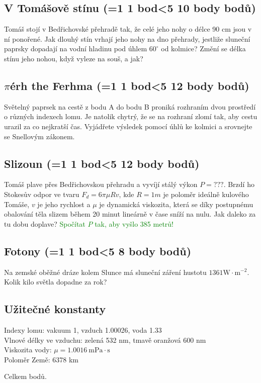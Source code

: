 \documentclass[11pt,a4paper,landscape,twocolumn]{article}
\newcounter{bodycounter}
\newcommand{\bodystring}[1]{\ifnum #1=1 1 bod\else\ifnum #1<5 #1 body\else #1 bodů\fi\fi}
\newcommand{\uloha}[3]{
\subsection{#1 (\bodystring{#2})}
#3\addtocounter{bodycounter}{#2}}
\begin{document}
\uloha{V Tomášově stínu}{10}{
Tomáš stojí v Bedřichovské přehradě tak, že celé jeho nohy o délce 90 cm jsou v ní ponořené. Jak dlouhý stín vrhají jeho nohy na dno přehrady, jestliže sluneční paprsky dopadají na vodní hladinu pod úhlem $60^\circ$ od kolmice? Změní se délka stínu jeho nohou, když vyleze na souš, a jak?
}

\uloha{$\pi$érh the Ferhma}{12}{
Světelný paprsek na cestě z bodu A do bodu B proniká rozhraním dvou prostředí o různých indexech lomu. Je natolik chytrý, že se na rozhraní zlomí tak, aby cestu urazil za co nejkratší čas. Vyjádřete výsledek pomocí úhlů ke kolmici a srovnejte se Snellovým zákonem.
}

\uloha{Slizoun}{12}{
Tomáš plave přes Bedřichovskou přehradu a vyvíjí stálý výkon $P = ???$. Brzdí ho Stokesův odpor ve tvaru $F_d = 6\pi \mu Rv$, kde $R = 1 m$ je poloměr ideálně kulového Tomáše, $v$ je jeho rychlost a $\mu$ je dynamická viskozita, která se díky postupnému obalování těla slizem během 20 minut lineárně v čase sníží na nulu. Jak daleko za tu dobu doplave? \textcolor{green}{Spočítat $P$ tak, aby vyšlo 385 metrů!}
}

\uloha{Fotony}{8}{
Na zemské oběžné dráze kolem Slunce má sluneční záření hustotu $1361 \mathrm{W\cdot m^{-2}}$. Kolik kilo světla dopadne za rok?
}

\subsection*{Užitečné konstanty}
Indexy lomu: vakuum 1, vzduch 1.00026, voda 1.33 \\
Vlnové délky ve vzduchu: zelená 532 nm, tmavě oranžová 600 nm\\
Viskozita vody: $\mu = 1.0016~\mathrm{mPa\cdot s}$\\
Poloměr Země: 6378 km

\newpage Celkem  bodů.
\end{document}
